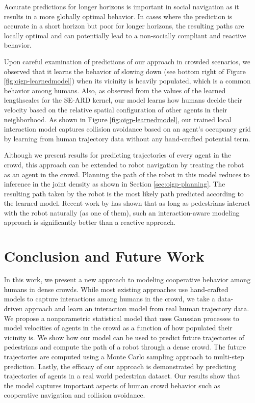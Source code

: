 Accurate predictions for longer horizons is important in social navigation
as it results in a more globally optimal behavior. In cases where the
prediction is accurate in a short horizon but poor for longer horizons,
the resulting paths are locally optimal and can potentially lead to a
non-socially compliant and reactive behavior.

Upon careful examination of predictions of our approach in crowded
scenarios, we observed that it learns the behavior of slowing down
(see bottom right of Figure \ref{fig:oigp-learnedmodel}) when its vicinity
is heavily populated, which is a common behavior among humans. Also,
as observed from the values of the learned lengthscales for the SE-ARD
kernel, our model learns how humans decide their velocity based on the
relative spatial configuration of other agents in their
neighborhood. As shown in Figure \ref{fig:oigp-learnedmodel}, our trained
local interaction model captures collision avoidance based on an
agent's occupancy grid by learning from human trajectory data without
any hand-crafted potential term.

Although we present results for predicting trajectories of every
agent in the crowd, this approach can be extended to robot navigation by
treating the robot as an agent in the crowd. Planning the path of the
robot in this model reduces to inference in the joint density as shown
in Section \ref{sec:oigp-planning}. The resulting path taken by the robot
is the most likely path predicted according to the learned
model. Recent work by \cite{pfeiffer16} has shown that as long as
pedestrians interact with the robot naturally (as one of them), such
an interaction-aware modeling approach is significantly better than a
reactive approach.


\section{Conclusion and Future Work}
\label{sec:oigp-conclusion}

In this work, we present a new approach to modeling cooperative
behavior among humans in dense crowds. While most existing approaches
use hand-crafted models to capture interactions among humans in the
crowd, we take a data-driven approach and learn an interaction model
from real human trajectory data. We propose a nonparametric
statistical model that uses Gaussian processes to model velocities of
agents in the crowd as a function of how populated their vicinity
is. We show how our model can be used to predict future trajectories
of pedestrians and compute the path of a robot through a dense
crowd. The future trajectories are computed using a Monte Carlo
sampling approach to multi-step prediction. Lastly, the efficacy of
our approach is demonstrated by predicting trajectories of agents in a
real world pedestrian dataset. Our results show that the model
captures important aspects of human crowd behavior such as cooperative
navigation and collision avoidance.

